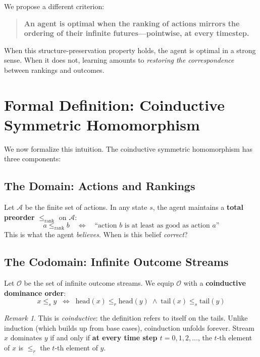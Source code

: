 \documentclass[9pt,a4paper]{article}
\theoremstyle{plain}
\theoremstyle{definition}
\theoremstyle{remark}
\newtheorem{remark}{Remark}
\begin{document}
We propose a different criterion:

\begin{quote}
\textbf{An agent is optimal when the ranking of actions mirrors the ordering of their infinite futures---pointwise, at every timestep.}
\end{quote}

When this structure-preservation property holds, the agent is optimal in a strong sense. When it does not, learning amounts to \emph{restoring the correspondence} between rankings and outcomes.


\section{Formal Definition: Coinductive Symmetric Homomorphism}

We now formalize this intuition. The coinductive symmetric homomorphism has three components:

\subsection{The Domain: Actions and Rankings}

Let $\mathcal{A}$ be the finite set of actions. In any state $s$, the agent maintains a \textbf{total preorder} $\le_{\text{rank}}$ on $\mathcal{A}$:
\[
a \le_{\text{rank}} b \quad \Longleftrightarrow \quad \text{``action } b \text{ is at least as good as action } a\text{''}
\]
This is what the agent \emph{believes}. When is this belief \emph{correct}?

\subsection{The Codomain: Infinite Outcome Streams}

Let $\mathcal{O}$ be the set of infinite outcome streams. We equip $\mathcal{O}$ with a \textbf{coinductive dominance order}:
\[
x \le_s y \;\;\Longleftrightarrow\;\; \text{head}(x) \le_r \text{head}(y) \;\wedge\; \text{tail}(x) \le_s \text{tail}(y)
\]

\begin{remark}
This is \emph{coinductive}: the definition refers to itself on the tails. Unlike induction (which builds up from base cases), coinduction unfolds forever. Stream $x$ dominates $y$ if and only if \textbf{at every time step $t = 0, 1, 2, \ldots$}, the $t$-th element of $x$ is $\le_r$ the $t$-th element of $y$.
\end{remark}
\end{document}
